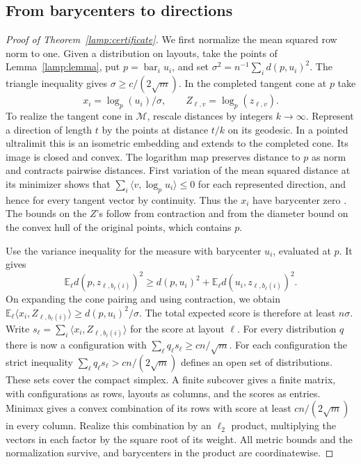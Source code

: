 \subsection{From barycenters to directions}

\begin{proof}[Proof of Theorem~\ref{lamp:certificate}]
We first normalize the mean squared row norm to one. Given a distribution
on layouts, take the points of Lemma~\ref{lamp:lemma}, put
\(p=\operatorname{bar}_i u_i\), and set
\(\sigma^2=n^{-1}\sum_i d(p,u_i)^2\). The triangle inequality gives
\(\sigma\ge c/(2\sqrt m)\). In the completed tangent cone at \(p\) take
\[
 x_i=\log_p(u_i)/\sigma,\qquad Z_{\ell,v}=\log_p(z_{\ell,v}).
\]
To realize the tangent cone in \(\mathcal M\), rescale distances
by integers \(k\to\infty\). Represent a direction of length \(t\)
by the points at distance \(t/k\) on its geodesic. In a pointed
ultralimit this is an isometric embedding and extends to the
completed cone. Its image is closed and convex. The logarithm map preserves distance to \(p\)
as norm and contracts pairwise distances. First variation of the mean
squared distance at its minimizer shows that
\(\sum_i\langle v,\log_p u_i\rangle\le0\) for each represented direction,
and hence for every tangent vector by continuity. Thus the \(x_i\)
have barycenter zero \cite{BH,Sturm}. The bounds on the \(Z\)'s follow
from contraction and from the diameter bound on the convex hull of
the original points, which contains \(p\).

Use the variance inequality for the measure with barycenter \(u_i\),
evaluated at \(p\). It gives
\[
 \mathbb E_\ell d(p,z_{\ell,b_\ell(i)})^2
 \ge d(p,u_i)^2+\mathbb E_\ell d(u_i,z_{\ell,b_\ell(i)})^2 .
\]
On expanding the cone pairing and using contraction, we obtain
\(\mathbb E_\ell\langle x_i,Z_{\ell,b_\ell(i)}\rangle
\ge d(p,u_i)^2/\sigma\). The total expected score is therefore at
least \(n\sigma\). Write \(s_\ell=\sum_i\langle x_i,Z_{\ell,b_\ell(i)}\rangle\) for
the score at layout \(\ell\). For every distribution \(q\) there is
now a configuration with \(\sum_\ell q_\ell s_\ell\ge cn/\sqrt m\).
For each configuration the strict inequality
\(\sum_\ell q_\ell s_\ell>cn/(2\sqrt m)\) defines an open set of
distributions. These sets cover the compact simplex. A finite subcover
gives a finite matrix, with configurations as rows, layouts as columns,
and the scores as entries. Minimax gives a convex combination of its
rows with score at least \(cn/(2\sqrt m)\) in every column. Realize this combination by
an \(\ell_2\) product, multiplying the vectors in each factor by the
square root of its weight. All metric bounds and the normalization
survive, and barycenters in the product are coordinatewise.


\end{proof}
